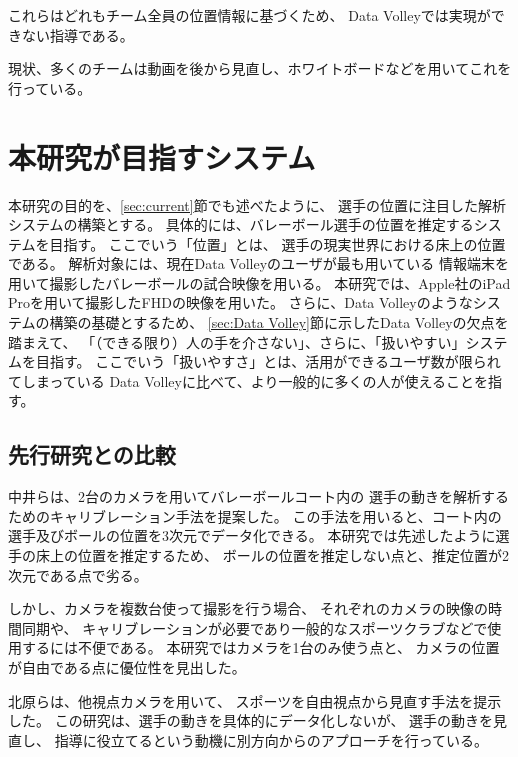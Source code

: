 \documentclass[a4j, fleqn, 12pt]{jsreport}
\begin{document}
        これらはどれもチーム全員の位置情報に基づくため、
        Data Volleyでは実現ができない指導である。

        現状、多くのチームは動画を後から見直し、ホワイトボードなどを用いてこれを行っている。

    \section{本研究が目指すシステム} \label{sec:system}
        本研究の目的を、\ref{sec:current}節でも述べたように、
        選手の位置に注目した解析システムの構築とする。
        具体的には、バレーボール選手の位置を推定するシステムを目指す。
        ここでいう「位置」とは、
        選手の現実世界における床上の位置である。
        解析対象には、現在Data Volleyのユーザが最も用いている
        情報端末を用いて撮影したバレーボールの試合映像を用いる。
        本研究では、Apple社のiPad Proを用いて撮影したFHDの映像を用いた。
        さらに、Data Volleyのようなシステムの構築の基礎とするため、
        \ref{sec:Data Volley}節に示したData Volleyの欠点を踏まえて、
        「（できる限り）人の手を介さない」、さらに、「扱いやすい」システムを目指す。
        ここでいう「扱いやすさ」とは、活用ができるユーザ数が限られてしまっている
        Data Volleyに比べて、より一般的に多くの人が使えることを指す。

        \subsection {先行研究との比較}
            中井ら\cite{Nakai}は、2台のカメラを用いてバレーボールコート内の
            選手の動きを解析するためのキャリブレーション手法を提案した。
            この手法を用いると、コート内の選手及びボールの位置を3次元でデータ化できる。
            本研究では先述したように選手の床上の位置を推定するため、
            ボールの位置を推定しない点と、推定位置が2次元である点で劣る。

            しかし、カメラを複数台使って撮影を行う場合、
            それぞれのカメラの映像の時間同期や、
            キャリブレーションが必要であり一般的なスポーツクラブなどで使用するには不便である。
            本研究ではカメラを1台のみ使う点と、
            カメラの位置が自由である点に優位性を見出した。
            
            北原ら\cite{Kitahara}は、他視点カメラを用いて、
            スポーツを自由視点から見直す手法を提示した。
            この研究は、選手の動きを具体的にデータ化しないが、
            選手の動きを見直し、
            指導に役立てるという動機に別方向からのアプローチを行っている。
\end{document}
